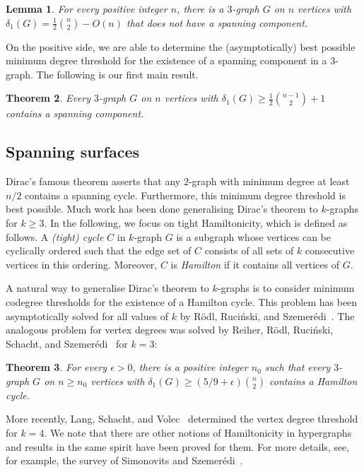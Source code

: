 \documentclass[12pt,reqno]{amsart}
\theoremstyle{plain}
\newtheorem{theorem}{Theorem}[section]
\newtheorem{lemma}[theorem]{Lemma}
\theoremstyle{definition}
\numberwithin{equation}{section}
\begin{document}
	\begin{lemma}\label{lem:HamCompDegOptimal}
		For every positive integer $n$, there is a $3$-graph $G$ on $n$ vertices with $\delta_1(G) = \frac{1}{2}\binom{n}{2}- O(n)$ that does not have a spanning component.
	\end{lemma}
	
	On the positive side, we are able to determine the (asymptotically) best possible minimum degree threshold for the existence of a spanning component in a $3$-graph.
	The following is our first main result.
	
	\begin{theorem}\label{thm:spanning-component}
		Every $3$-graph $G$ on $n$ vertices with $\delta_1(G) \geq \tfrac{1}{2}\binom{n-1}{2}+1$ contains a spanning component.
	\end{theorem}
    


    
	\subsection{Spanning surfaces}
	
	Dirac's famous theorem asserts that any $2$-graph with minimum degree at least $n/2$ contains a spanning cycle.
	Furthermore, this minimum degree threshold is best possible.
	Much work has been done generalising Dirac's theorem to $k$-graphs for $k \geq 3$.
	In the following, we focus on tight Hamiltonicity, which is defined as follows.	
	A \emph{(tight) cycle} $C$ in $k$-graph $G$ is a subgraph whose vertices can be cyclically ordered such that the edge set of $C$ consists of all sets of $k$ consecutive vertices in this ordering.
	Moreover, $C$ is \emph{Hamilton} if it contains all vertices of $G$.
	
	A natural way to generalise Dirac's theorem to $k$-graphs is to consider minimum codegree thresholds for the existence of a Hamilton cycle.
	This problem has been asymptotically solved for all values of $k$ by R\"odl, Ruci\'nski, and Szemer\'edi~\cite{MinCoDegTHC2}.
	The analogous problem for vertex degrees was solved by Reiher, R\"odl, Ruci\'nski, Schacht, and Szemer\'edi~\cite{RRR19} for $k=3$:
	\begin{theorem}\label{t:mindegHamiltonCycle}
		For every $\epsilon > 0$, there is a positive integer $n_0$ such that every $3$-graph $G$ on $n \geq n_0$ vertices with $\delta_1(G) \geq (5/9+\epsilon)\binom{n}{2}$ contains a Hamilton cycle. 
	\end{theorem} 
	More recently, Lang, Schacht, and Volec~\cite{LSV24} determined the vertex degree threshold for $k=4$.
	We note that there are other notions of Hamiltonicity in hypergraphs and results in the same spirit have been proved for them.
	For more details, see, for example, the survey of Simonovits and Szemerédi~\cite{SS19}.
	
\end{document}
